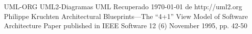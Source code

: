 \begin{thebibliography}{9}
	UML-ORG UML2-Diagramas UML Recuperado \today \hspace{0.1cm} de
	http://uml2.org 
	Philippe Kruchten Architectural Blueprints—The “4+1” View Model of Software Architecture Paper published in IEEE Software 12 (6) November 1995, pp. 42-50
\end{thebibliography}